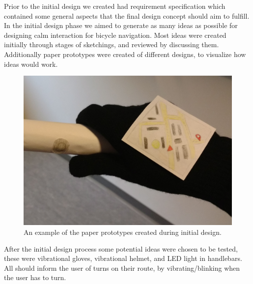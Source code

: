 \documentclass{sigchi}
\begin{document}
Prior to the initial design we created had requirement specification which contained some general aspects that the final design concept should aim to fulfill. In the initial design phase we aimed to generate as many ideas as possible for designing calm interaction for bicycle navigation. Most ideas were created initially through stages of sketchings, and reviewed by discussing them. Additionally paper prototypes were created of different designs, to visualize how ideas would work.
\begin{figure}[!b]
\centering
  \includegraphics[width=0.8\columnwidth]{figures/handle-button.jpg}
  \caption{An example of the paper prototypes created during initial design.}\label{fig:figure1}
\end{figure}
After the initial design process some potential ideas were chosen to be tested, these were vibrational gloves, vibrational helmet, and LED light in handlebars. All should inform the user of turns on their route, by vibrating/blinking when the user has to turn.
\end{document}
